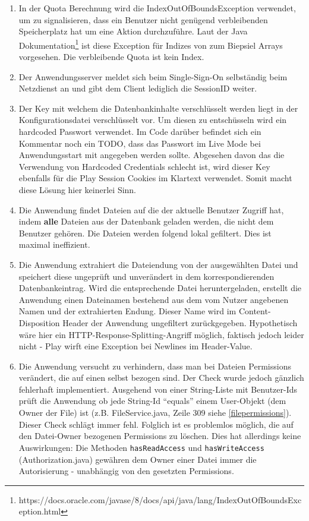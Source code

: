 \documentclass[12pt,DIV14,BCOR10mm,a4paper,parskip=half-,headsepline,headinclude,english,ngerman,bibliography=totocnumbered]{scrreprt}
\begin{document}
\begin{enumerate}
  \item In der Quota Berechnung wird die IndexOutOfBoundsException verwendet, um zu signalisieren, dass ein Benutzer nicht genügend verbleibenden Speicherplatz hat um eine Aktion durchzuführe. Laut der Java Dokumentation\footnote{https://docs.oracle.com/javase/8/docs/api/java/lang/IndexOutOfBoundsException.html} ist diese Exception für Indizes von zum Biepsiel Arrays vorgesehen. Die verbleibende Quota ist kein Index.  
  \item Der Anwendungsserver meldet sich beim Single-Sign-On selbständig beim Netzdienst an und gibt dem Client lediglich die SessionID weiter.
  \item Der Key mit welchem die Datenbankinhalte verschlüsselt werden liegt in der Konfigurationsdatei verschlüsselt vor. Um diesen zu entschüsseln wird ein hardcoded Passwort verwendet. Im Code darüber befindet sich ein Kommentar noch ein TODO, dass das Passwort im Live Mode bei Anwendungsstart mit angegeben werden sollte. Abgesehen davon das die Verwendung von Hardcoded Credentials schlecht ist, wird dieser Key ebenfalls für die Play Session Cookies im Klartext verwendet. Somit macht diese Lösung hier keinerlei Sinn.
  \item Die Anwendung findet Dateien auf die der aktuelle Benutzer Zugriff hat, indem \textbf{alle} Dateien aus der Datenbank geladen werden, die nicht dem Benutzer gehören. Die Dateien werden folgend lokal gefiltert. Dies ist maximal ineffizient.
  \item Die Anwendung extrahiert die Dateiendung von der ausgewählten Datei und speichert diese ungeprüft und unverändert in dem korrespondierenden Datenbankeintrag. Wird die entsprechende Datei heruntergeladen, erstellt die Anwendung einen Dateinamen bestehend aus dem vom Nutzer angebenen Namen und der extrahierten Endung. Dieser Name wird im Content-Disposition Header der Anwendung ungefiltert zurückgegeben. Hypothetisch wäre hier ein HTTP-Response-Splitting-Angriff möglich, faktisch jedoch leider nicht - Play wirft eine Exception bei Newlines im Header-Value.
  \item Die Anwendung versucht zu verhindern, dass man bei Dateien Permissions verändert, die auf einen selbst bezogen sind. Der Check wurde jedoch gänzlich fehlerhaft implementiert. Ausgehend von einer String-Liste mit Benutzer-Ids prüft die Anwendung ob jede String-Id \enquote{equals} einem User-Objekt (dem Owner der File) ist (z.B. FileService.java, Zeile 309 siehe \ref{filepermissions}). Dieser Check schlägt immer fehl. Folglich ist es problemlos möglich, die auf den Datei-Owner bezogenen Permissions zu löschen. Dies hat allerdings keine Auswirkungen: Die Methoden \texttt{hasReadAccess} und \texttt{hasWriteAccess} (Authorization.java) gewähren dem Owner einer Datei immer die Autorisierung - unabhängig von den gesetzten Permissions.

\end{enumerate}
\end{document}
